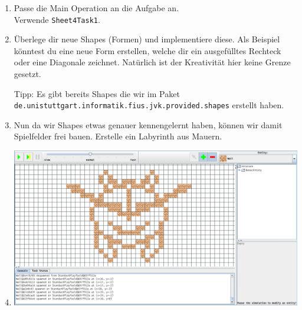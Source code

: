 
\begin{enumerate}
	\item
		Passe die Main Operation an die Aufgabe an.\\
		Verwende \lstinline{Sheet4Task1}.

	\item
		Überlege dir neue Shapes (Formen) und implementiere diese.
		Als Beispiel könntest du eine neue Form erstellen, welche dir ein ausgefülltes Rechteck oder eine Diagonale zeichnet.
		Natürlich ist der Kreativität hier keine Grenze gesetzt.

		Tipp: Es gibt bereits Shapes die wir im Paket \lstinline{de.unistuttgart.informatik.fius.jvk.provided.shapes} erstellt haben.

	\item
		Nun da wir Shapes etwas genauer kennengelernt haben, können wir damit Spielfelder frei bauen.
		Erstelle ein Labyrinth aus Mauern.

	\item
		\includegraphics[width=\linewidth]{./figures/playfield.png}

\end{enumerate}

\newpage
